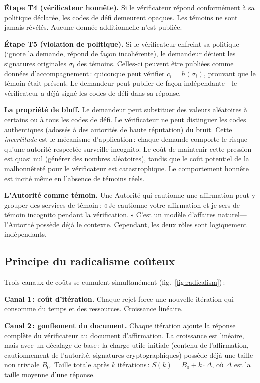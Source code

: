 \documentclass[11pt,a4paper,twocolumn]{article}
\begin{document}
\textbf{Étape T4 (vérificateur honnête).} Si le vérificateur répond conformément à sa politique déclarée, les codes de défi demeurent opaques. Les témoins ne sont jamais révélés. Aucune donnée additionnelle n'est publiée.

\textbf{Étape T5 (violation de politique).} Si le vérificateur enfreint sa politique (ignore la demande, répond de façon incohérente), le demandeur détient les signatures originales $\sigma_i$ des témoins. Celles-ci peuvent être publiées comme données d'accompagnement\,: quiconque peut vérifier $c_i = h(\sigma_i)$, prouvant que le témoin était présent. Le demandeur peut publier de façon indépendante---le vérificateur a déjà signé les codes de défi dans sa réponse.

\textbf{La propriété de bluff.} Le demandeur peut substituer des valeurs aléatoires à certains ou à tous les codes de défi. Le vérificateur ne peut distinguer les codes authentiques (adossés à des autorités de haute réputation) du bruit. Cette \emph{incertitude} est le mécanisme d'application\,: chaque demande comporte le risque qu'une autorité respectée surveille incognito. Le coût de maintenir cette pression est quasi nul (générer des nombres aléatoires), tandis que le coût potentiel de la malhonnêteté pour le vérificateur est catastrophique. Le comportement honnête est incité même en l'absence de témoins réels.

\textbf{L'Autorité comme témoin.} Une Autorité qui cautionne une affirmation peut y grouper des services de témoin\,: «\,Je cautionne votre affirmation et je sers de témoin incognito pendant la vérification.\,» C'est un modèle d'affaires naturel---l'Autorité possède déjà le contexte. Cependant, les deux rôles sont logiquement indépendants.

\subsection{Principe du radicalisme coûteux}

Trois canaux de coûts se cumulent simultanément (fig.~\ref{fig:radicalism})\,:

\textbf{Canal 1\,: coût d'itération.} Chaque rejet force une nouvelle itération qui consomme du temps et des ressources. Croissance linéaire.

\textbf{Canal 2\,: gonflement du document.} Chaque itération ajoute la réponse complète du vérificateur au document d'affirmation. La croissance est linéaire, mais avec un décalage de base\,: la charge utile initiale (contenu de l'affirmation, cautionnement de l'autorité, signatures cryptographiques) possède déjà une taille non triviale $B_0$. Taille totale après $k$ itérations\,: $S(k) = B_0 + k \cdot \Delta$, où $\Delta$ est la taille moyenne d'une réponse.
\end{document}
